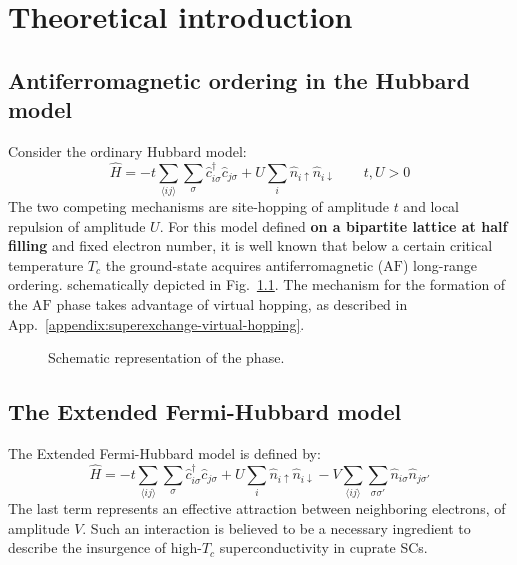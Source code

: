 \chapter{Theoretical introduction}\label{chapter:theoretical-introduction}

\todo

\section{Antiferromagnetic ordering in the Hubbard model}

Consider the ordinary Hubbard model:
\[
	\hat H = 
	-t \sum_{\langle ij \rangle} \sum_\sigma \hat c_{i\sigma}^\dagger \hat c_{j\sigma}
	+ U \sum_i \hat n_{i\uparrow} \hat n_{i\downarrow}
	\qquad
	t, U  > 0
\]
The two competing mechanisms are site-hopping of amplitude $t$ and local repulsion of amplitude $U$. For this model defined \textbf{on a bipartite lattice at half filling} and fixed electron number, it is well known that below a certain critical temperature $T_c$ the ground-state acquires antiferromagnetic ($\mathrm{AF}$) long-range ordering. schematically depicted in Fig.~\ref{fig:antiferromagnet}. The mechanism for the formation of the $\mathrm{AF}$ phase takes advantage of virtual hopping, as described in App.~\ref{appendix:superexchange-virtual-hopping}. \todo

\begin{figure}
	\centering
	
	\caption{Schematic representation of the \AF phase.}
	\label{fig:antiferromagnet}
\end{figure}

\section{The Extended Fermi-Hubbard model}

The Extended Fermi-Hubbard model is defined by:
\[
	\hat H = 
	-t \sum_{\langle ij \rangle} \sum_\sigma \hat c_{i\sigma}^\dagger \hat c_{j\sigma}
	+ U \sum_i \hat n_{i\uparrow} \hat n_{i\downarrow}
	- V \sum_{\langle ij \rangle} \sum_{\sigma \sigma'} \hat n_{i\sigma} \hat n_{j\sigma'}
\]
The last term represents an effective attraction between neighboring electrons, of amplitude $V$. Such an interaction is believed \cite{cao2025p-wave} to be a necessary ingredient to describe the insurgence of high-$T_c$ superconductivity in cuprate SCs. \todo